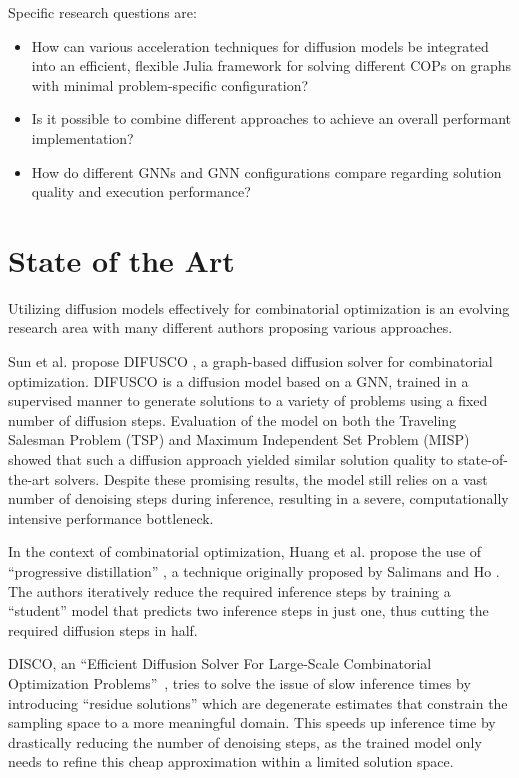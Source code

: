\documentclass[11pt,a4paper]{article}
\begin{document}
Specific research questions are:
\begin{itemize}
    \item How can various acceleration techniques for diffusion models be integrated into an efficient, flexible Julia framework for solving different COPs on graphs with minimal problem-specific configuration?
    \item Is it possible to combine different approaches to achieve an overall performant implementation?
    \item How do different GNNs and GNN configurations compare regarding solution quality and execution performance?
\end{itemize}

\section{State of the Art}
Utilizing diffusion models effectively for combinatorial optimization is an evolving research area with many different authors proposing various approaches.

Sun et al. propose DIFUSCO \cite{sun-23-difusco}, a graph-based diffusion solver for combinatorial optimization. DIFUSCO is a diffusion model based on a GNN, trained in a supervised manner to generate solutions to a variety of problems using a fixed number of diffusion steps. Evaluation of the model on both the Traveling Salesman Problem (TSP) and Maximum Independent Set Problem (MISP) showed that such a diffusion approach yielded similar solution quality to state-of-the-art solvers. Despite these promising results, the model still relies on a vast number of denoising steps during inference, resulting in a severe, computationally intensive performance bottleneck.

In the context of combinatorial optimization, Huang et al. propose the use of ``progressive distillation'' \cite{huang-23-progressive-distillation-co}, a technique originally proposed by Salimans and Ho \cite{salimans-22-progressive-distillation-original}. The authors iteratively reduce the required inference steps by training a ``student'' model that predicts two inference steps in just one, thus cutting the required diffusion steps in half.  

DISCO, an ``Efficient Diffusion Solver For Large-Scale Combinatorial Optimization Problems''~\cite{zhao-25-disco}, tries to solve the issue of slow inference times by introducing ``residue solutions'' which are degenerate estimates that constrain the sampling space to a more meaningful domain. This speeds up inference time by drastically reducing the number of denoising steps, as the trained model only needs to refine this cheap approximation within a limited solution space.
\end{document}
